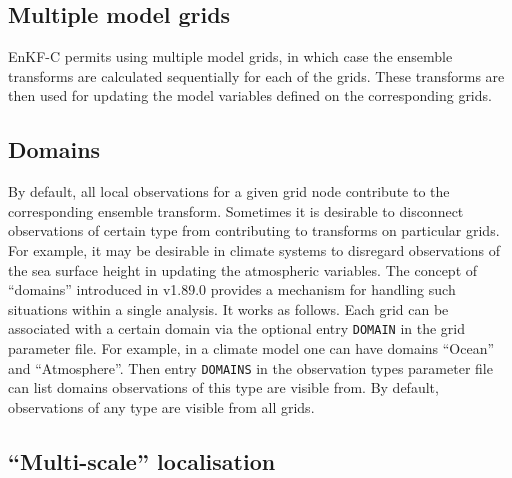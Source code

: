 \documentclass[11pt]{report}
\begin{document}
\subsection{Multiple model grids}

EnKF-C permits using multiple model grids, in which case the ensemble transforms are calculated sequentially for each of the grids.
These transforms are then used for updating the model variables defined on the corresponding grids.

\subsection{Domains}
\label{sec:domains}

By default, all local observations for a given grid node contribute to the corresponding ensemble transform.
Sometimes it is desirable to disconnect observations of certain type from contributing to transforms on particular grids.
For example, it may be desirable in climate systems to disregard observations of the sea surface height in updating the atmospheric variables.
The concept of ``domains'' introduced in v1.89.0 provides a mechanism for handling such situations within a single analysis.
It works as follows.
Each grid can be associated with a certain domain via the optional entry \verb|DOMAIN| in the grid parameter file.
For example, in a climate model one can have domains ``Ocean'' and ``Atmosphere''.
Then entry \verb|DOMAINS| in the observation types parameter file can list domains observations of this type are visible from.
By default, observations of any type are visible from all grids.

\subsection {``Multi-scale'' localisation}
\end{document}

